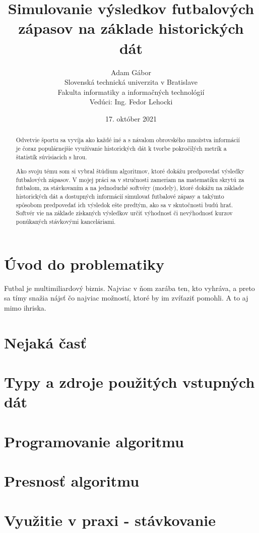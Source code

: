 \documentclass[10pt,twoside,slovak,a4paper]{article}
\title{Simulovanie výsledkov futbalových zápasov na základe historických dát}
\author{Adam Gábor\\[2pt]
	{\small Slovenská technická univerzita v Bratislave}\\
	{\small Fakulta informatiky a informačných technológií}\\
	{\small Vedúci: Ing. Fedor Lehocki}\\
	}
\date{\small 17. október 2021}
\begin{document}
\maketitle

\begin{abstract}
Odvetvie športu sa vyvíja ako každé iné a s návalom obrovského množstva informácií je čoraz populárnejšie využívanie historických dát k tvorbe pokročilých metrík a štatistík súvisiacich s hrou.

Ako svoju tému som si vybral štúdium algoritmov, ktoré dokážu predpovedať výsledky futbalových zápasov. V mojej práci sa v stručnosti zameriam na matematiku skrytú za futbalom, za stávkovaním a na jednoduché softvéry (modely), ktoré dokážu na základe historických dát a dostupných informácií simulovať futbalové zápasy a takýmto spôsobom predpovedať ich výsledok ešte predtým, ako sa v skutočnosti budú hrať. Softvér vie na základe získaných výsledkov určiť výhodnosť či nevýhodnosť kurzov ponúkaných stávkovými kanceláriami.

\end{abstract}



\section{Úvod do problematiky}

Futbal je multimiliardový biznis. Najviac v ňom zarába ten, kto vyhráva, a preto sa tímy snažia nájsť čo najviac možností, ktoré by im zvíťaziť pomohli. A to aj mimo ihriska.

\section{Nejaká časť}

\section{Typy a zdroje použitých vstupných dát}

\section{Programovanie algoritmu}

\section{Presnosť algoritmu}

\section{Využitie v praxi - stávkovanie}
\end{document}
